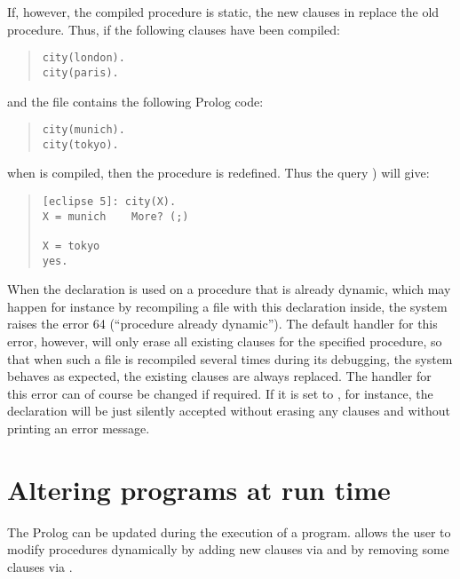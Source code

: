 If, however, the compiled procedure is static,
the new clauses in  replace the old procedure.
Thus, if
the following clauses have been compiled:
\begin{quote}
\begin{verbatim}
city(london).
city(paris).
\end{verbatim}
\end{quote}
and the file  contains the following Prolog code:
\begin{quote}
\begin{verbatim}
city(munich).
city(tokyo).
\end{verbatim}
\end{quote}
when  is compiled, then the procedure  is
redefined.
Thus the query ) will give:
\begin{quote}
\begin{verbatim}
[eclipse 5]: city(X).
X = munich    More? (;)

X = tokyo
yes.
\end{verbatim}
\end{quote}

When the  declaration
is used on a procedure that is
already dynamic, which may happen for instance by recompiling a file
with this declaration inside, the system raises the error 64
(``procedure already dynamic'').
The default handler for this error, however, will only erase
all existing clauses for the specified procedure, so that
when such a file is recompiled several times during its debugging,
the system behaves as expected, the existing clauses
are always replaced.
The handler for this error can of course be changed if required.
If it is set to , for
instance,
the  declaration will
be just silently
accepted without erasing any clauses and without printing an error message.

\section{Altering programs at run time}

The Prolog  can be updated during the execution of a program.
{\eclipse} allows the user to modify procedures dynamically by adding
new clauses via
and by removing some clauses via
.

